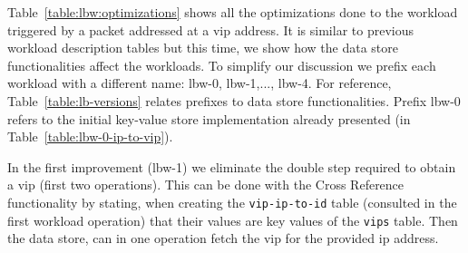 \begin{figure}[ht]
\begin{floatrow}
\end{floatrow}
\end{figure}

Table~\ref{table:lbw:optimizations} shows all the optimizations done to the 
workload triggered by a packet addressed at a \gls{vip}
address.
It is similar to previous workload description tables but this time, we show how the data store functionalities affect the workloads. 
To simplify our discussion we prefix each workload with a different name: lbw-0, lbw-1,..., lbw-4. 
For reference, Table~\ref{table:lb-versions} relates prefixes to data store functionalities. 
Prefix lbw-0 refers to the initial key-value store implementation already presented (in Table~\ref{table:lbw-0-ip-to-vip}). 

In the first improvement (lbw-1) we eliminate the double step required to obtain a \gls{vip} (first two operations). 
This can be done with the Cross Reference functionality by stating, when creating the \texttt{vip-ip-to-id} table (consulted in the first workload operation)  that their values are key values of the \texttt{vips} table. Then the data store, can  in one operation  fetch the \gls{vip} for the provided \gls{ip} address. 


